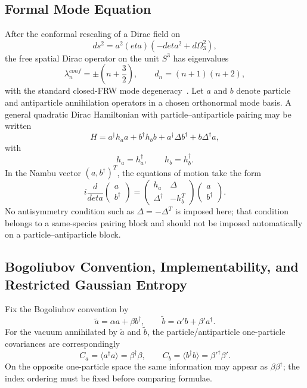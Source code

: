 \documentclass[11pt]{article}
\theoremstyle{canonmath}
\theoremstyle{canonpostulate}
\theoremstyle{canonclaim}
\def\mathrm#1{#1}%
\def\eta{eta}%
\begin{document}
\subsection{Formal Mode Equation}
After the conformal rescaling of a Dirac field on
\begin{equation}
ds^2=a^2(\eta)\left(-d\eta^2+d\Omega_3^2\right),
\end{equation}
the free spatial Dirac operator on the unit $S^3$ has eigenvalues
\begin{equation}
\lambda_n^{\mathrm{conf}}=\pm\left(n+\frac32\right),\qquad d_n=(n+1)(n+2),
\end{equation}
with the standard closed-FRW mode degeneracy~\cite{CortezDiracFRW}. Let $a$ and $b$ denote particle and antiparticle annihilation operators in a chosen orthonormal mode basis. A general quadratic Dirac Hamiltonian with particle--antiparticle pairing may be written
\begin{equation}
H=a^\dagger h_a a+b^\dagger h_b b+a^\dagger\Delta b^\dagger+b\Delta^\dagger a,
\end{equation}
with
\begin{equation}
h_a=h_a^\dagger,\qquad h_b=h_b^\dagger.
\end{equation}
In the Nambu vector $(a,b^\dagger)^T$, the equations of motion take the form
\begin{equation}
i\frac{d}{d\eta}\begin{pmatrix}a\\ b^\dagger\end{pmatrix}
=\begin{pmatrix}h_a&\Delta\\ \Delta^\dagger&-h_b^T\end{pmatrix}\begin{pmatrix}a\\ b^\dagger\end{pmatrix}.
\label{eq:nambu}
\end{equation}
No antisymmetry condition such as $\Delta=-\Delta^T$ is imposed here; that condition belongs to a same-species pairing block and should not be imposed automatically on a particle--antiparticle block.

\subsection{Bogoliubov Convention, Implementability, and Restricted Gaussian Entropy}
Fix the Bogoliubov convention by
\begin{equation}
\widetilde a=\alpha a+\beta b^\dagger,\qquad\widetilde b=\alpha' b+\beta' a^\dagger.
\end{equation}
For the vacuum annihilated by $\widetilde a$ and $\widetilde b$, the particle/antiparticle one-particle covariances are correspondingly
\begin{equation}
C_a=\langle a^\dagger a\rangle=\beta^\dagger\beta,\qquad C_b=\langle b^\dagger b\rangle=\beta'^\dagger\beta'.
\end{equation}
On the opposite one-particle space the same information may appear as $\beta\beta^\dagger$; the index ordering must be fixed before comparing formulae.
\end{document}
